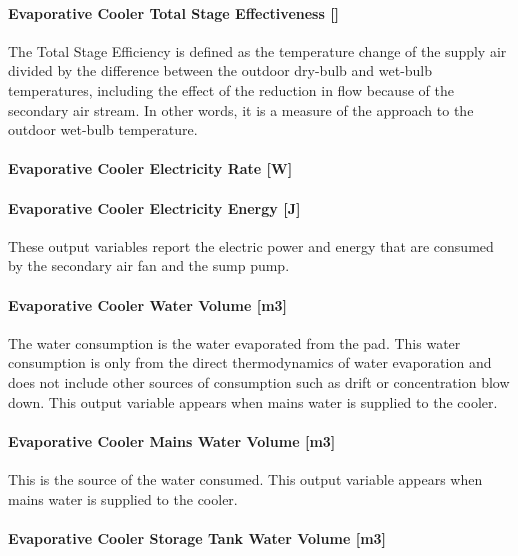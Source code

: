 \paragraph{Evaporative Cooler Total Stage Effectiveness {[]}}\label{evaporative-cooler-total-stage-effectiveness-1}

The Total Stage Efficiency is defined as the temperature change of the supply air divided by the difference between the outdoor dry-bulb and wet-bulb temperatures, including the effect of the reduction in flow because of the secondary air stream. In other words, it is a measure of the approach to the outdoor wet-bulb temperature.

\paragraph{Evaporative Cooler Electricity Rate {[}W{]}}\label{evaporative-cooler-electric-power-w}

\paragraph{Evaporative Cooler Electricity Energy {[}J{]}}\label{evaporative-cooler-electric-energy-j-3}

These output variables report the electric power and energy that are consumed by the secondary air fan and the sump pump.

\paragraph{Evaporative Cooler Water Volume {[}m3{]}}\label{evaporative-cooler-water-volume-m3-2}

The water consumption is the water evaporated from the pad. This water consumption is only from the direct thermodynamics of water evaporation and does not include other sources of consumption such as drift or concentration blow down. This output variable appears when mains water is supplied to the cooler.

\paragraph{Evaporative Cooler Mains Water Volume {[}m3{]}}\label{evaporative-cooler-mains-water-volume-m3-3}

This is the source of the water consumed. This output variable appears when mains water is supplied to the cooler.

\paragraph{Evaporative Cooler Storage Tank Water Volume {[}m3{]}}\label{evaporative-cooler-storage-tank-water-volume-m3-3}


